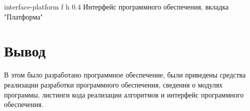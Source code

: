 {interface-platform} %
{f} %
{h} %
{0.4\textwidth} %
{Интерфейс программного обеспечения, вкладка "Платформа"} %



\section*{Вывод}

В этом было разработано программное обеспечение, были приведены средства реализации разработки программного обеспечения, сведения о модулях программы, листинги кода реализации алгоритмов и интерфейс программного обеспечения.
